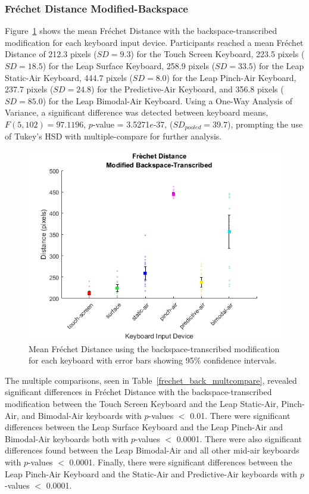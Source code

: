 \subsubsection{Fr\'echet Distance Modified-Backspace}
Figure~\ref{fig_frechet_back_mean} shows the mean Fr\'echet Distance with the backspace-transcribed modification for each keyboard input device. Participants reached a mean Fr\'echet Distance of 212.3 pixels ($SD = 9.3$) for the Touch Screen Keyboard, 223.5 pixels ($SD = 18.5$) for the Leap Surface Keyboard, 258.9 pixels ($SD = 33.5$) for the Leap Static-Air Keyboard, 444.7 pixels ($SD = 8.0$) for the Leap Pinch-Air Keyboard, 237.7 pixels ($SD = 24.8$) for the Predictive-Air Keyboard, and 356.8 pixels ($SD = 85.0$) for the Leap Bimodal-Air Keyboard. Using a One-Way Analysis of Variance, a significant difference was detected between keyboard means, $F(5, 102) = 97.1196$, $p$-value = 3.5271$e$-37, ($SD_{pooled} = 39.7$), prompting the use of Tukey's HSD with multiple-compare for further analysis.

\begin{figure}[h]
	\centering
	\includegraphics{fig_frechet_back_mean}
	\caption[Mean Fr\'echet Distance for Modified-Backspace]{Mean Fr\'echet Distance using the backspace-transcribed modification for each keyboard with error bars showing 95\% confidence intervals.}
	\label{fig_frechet_back_mean}
\end{figure}

The multiple comparisons, seen in Table~\ref{frechet_back_multcompare}, revealed significant differences in Fr\'echet Distance with the backspace-transcribed modification between the Touch Screen Keyboard and the Leap Static-Air, Pinch-Air, and Bimodal-Air keyboards with $p$-values $<$ 0.01. There were significant differences between the Leap Surface Keyboard and the Leap Pinch-Air and Bimodal-Air keyboards both with $p$-values $<$ 0.0001. There were also significant differences found between the Leap Bimodal-Air and all other mid-air keyboards with $p$-values $<$ 0.0001. Finally, there were significant differences between the Leap Pinch-Air Keyboard and the Static-Air and Predictive-Air keyboards with $p$-values $<$ 0.0001.

